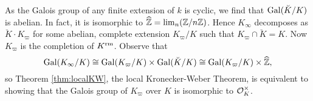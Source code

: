 \documentclass[../main.tex]{subfiles}
\begin{document}
As the Galois group of any finite extension
of $k$ is cyclic, we find that $\operatorname{Gal}(\breve K/K)$ is abelian. In fact,
it is isomorphic to $\widehat {\mathbb{Z}} = \lim_n (\mathbb{Z}/n\mathbb{Z})$. Hence
$K_\infty$ decomposes as $\breve K \cdot K_\varpi$ for some abelian, complete
extension $K_\varpi/K$ such that $K_\varpi \cap \breve K = K$. Now $K_\varpi$ is the 
completion of $K^{\mathrm{rm}}$. Observe that
\begin{equation*}
  \operatorname{Gal}(K_\infty/K) \cong \operatorname{Gal}(K_\varpi/K) \times \operatorname{Gal}(\breve K/K) \cong
  \operatorname{Gal}(K_\varpi/K) \times \widehat {\mathbb{Z}},
\end{equation*}
so Theorem \ref{thm:localKW}, the local Kronecker-Weber Theorem, is 
equivalent to showing that the Galois group of $K_\varpi$ over $K$ is 
isomorphic to $\mathcal{O}_K^\times$.


\end{document}
